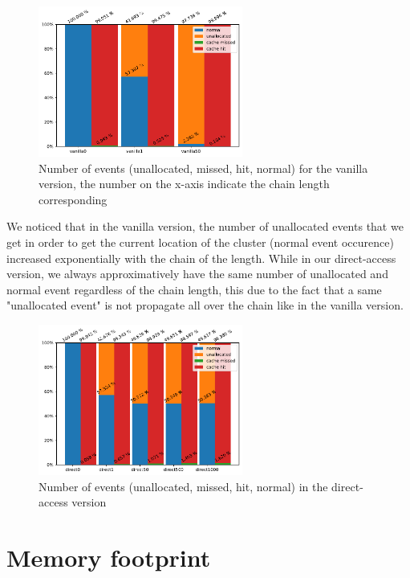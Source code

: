 \documentclass[sigplan,screen,10pt]{acmart}
\begin{document}
	
	\begin{figure}[h]
		\center
		\includegraphics[width=0.6\textwidth]{number_events_per_chain_va.pdf}
		\caption{Number of events (unallocated, missed, hit, normal) for the vanilla version, the number on the x-axis indicate the chain length corresponding}
		\label{fig:fig36}
	\end{figure}

	We noticed that in the vanilla version, the number of unallocated events that we get in order to get the current location of the cluster (normal event occurence) increased exponentially with the chain of the length. While in our direct-access version, we always approximatively have the same number of unallocated and normal event regardless of the chain length, this due to the fact that a same "unallocated event" is not propagate all over the chain like in the vanilla version.
	
	\begin{figure}[h]
		\center
		\includegraphics[width=0.6\textwidth]{number_events_per_chain_di.pdf}
		\caption{Number of events (unallocated, missed, hit, normal) in the direct-access version}
		\label{fig:fig37}
	\end{figure}


	\section*{Memory footprint}
	
\end{document}
